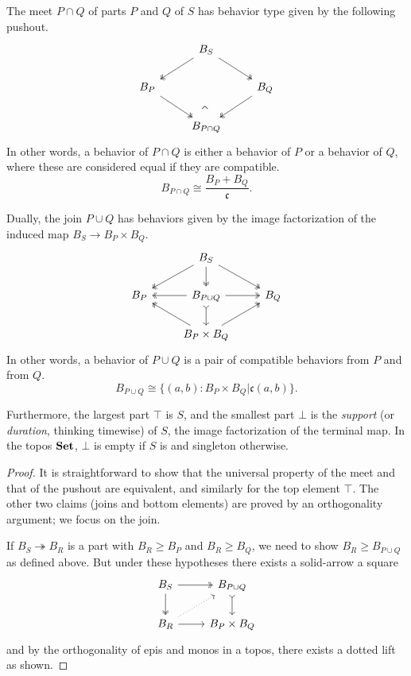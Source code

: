 \begin{prop}
The meet $P \cap Q$ of parts $P$ and $Q$ of $S$ has behavior type given by the following pushout.
\[
\begin{tikzcd}
 & B_S \arrow[ld, two heads] \arrow[rd, two heads] &  \\
B_P \arrow[rd, two heads] &  & B_Q \arrow[ld, two heads] \\
 & B_{P \cap Q} \ar[uu, phantom, very near start, "\rotatebox{45}{$\urcorner$}"]& 
\end{tikzcd}
\]
In other words, a behavior of $P \cap Q$ is either a behavior of $P$ or a behavior of $Q$, where these are considered equal if they are compatible.
$$B_{P \cap Q} \cong \frac{B_P + B_Q}{\mathfrak{c}}.$$

Dually, the join $P \cup Q$ has behaviors given by the image factorization of the induced map $B_S \to B_P \times B_Q$.
\[
\begin{tikzcd}
 & B_S \arrow[ld, two heads] \arrow[rd, two heads]\ar[d, two heads] &  \\
B_P & B_{P\cup Q}\ar[l, two heads]\ar[r, two heads]\ar[d, tail] & B_Q  \\
 & B_P\times B_Q\ar[ul, two heads]\ar[ur, two heads] 
\end{tikzcd}
\]
In other words, a behavior of $P \cup Q$ is a pair of compatible behaviors from $P$ and from $Q$.
$$B_{P \cup Q} \cong \{(a, b) : B_P \times B_Q | \mathfrak{c}(a, b)\}.$$

Furthermore, the largest part $\top$ is $S$, and the smallest part $\bot$ is the \emph{support} (or \emph{duration}, thinking timewise) of $S$, the image factorization of the terminal map. In the topos $\operatorname{\textbf{Set}}$, $\bot$ is empty if $S$ is and singleton otherwise.
\end{prop}
\begin{proof}
It is straightforward to show that the universal property of the meet and that of the pushout are equivalent, and similarly for the top element $\top$. The other two claims (joins and bottom elements) are proved by an orthogonality argument; we focus on the join.

If $B_S\twoheadrightarrow B_R$ is a part with $B_R\geq B_P$ and $B_R\geq B_Q$, we need to show $B_R\geq B_{P\cup Q}$ as defined above. But under these hypotheses there exists a solid-arrow a square
\[
\begin{tikzcd}
    B_S\ar[r, two heads]\ar[d, two heads]&
    B_{P\cup Q}\ar[d, tail]\\
    B_R\ar[r]\ar[ur, dotted]&
    B_P\times B_Q
\end{tikzcd}
\]
and by the orthogonality of epis and monos in a topos, there exists a dotted lift as shown.
\end{proof}


